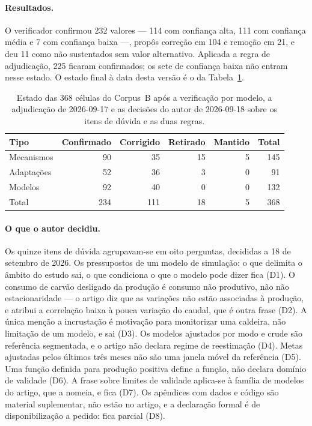 \paragraph{Resultados.} O verificador confirmou 232 valores --- 114 com
confiança alta, 111 com confiança média e 7 com confiança baixa ---, propôs
correção em 104 e remoção em 21, e deu 11 como não sustentados sem valor
alternativo. Aplicada a regra de adjudicação, 225 ficaram confirmados; os sete
de confiança baixa não entram nesse estado. O estado final à data desta versão
é o da Tabela~\ref{tab:apB-verificacao}.

\begin{table}[htbp]
  \centering\small
  \caption[Estado das células do Corpus B após a verificação por
  modelo]{Estado das 368 células do Corpus~B após a verificação por modelo,
  a adjudicação de 2026-09-17 e as decisões do autor de 2026-09-18 sobre os
  itens de dúvida e as duas regras.}
  \label{tab:apB-verificacao}
  \begin{tabular}{lrrrrr}
    \toprule
    Tipo & Confirmado & Corrigido & Retirado & Mantido & Total \\
    \midrule
    Mecanismos  & 90  & 35 & 15 & 5 & 145 \\
    Adaptações  & 52  & 36 & 3  & 0 & 91 \\
    Modelos     & 92  & 40 & 0  & 0 & 132 \\
    \midrule
    Total       & 234 & 111 & 18 & 5 & 368 \\
    \bottomrule
  \end{tabular}
\end{table}

\paragraph{O que o autor decidiu.} Os quinze itens de dúvida agrupavam-se em
oito perguntas, decididas a 18 de setembro de 2026. Os pressupostos de um
modelo de simulação: o que delimita o âmbito do estudo sai, o que condiciona
o que o modelo pode dizer fica (D1). O consumo de carvão desligado da
produção é consumo não produtivo, não não estacionaridade --- o artigo diz
que as variações não estão associadas à produção, e atribui a correlação
baixa à pouca variação do caudal, que é outra frase (D2). A única menção a
incrustação é motivação para monitorizar uma caldeira, não limitação de um
modelo, e sai (D3). Os modelos ajustados por modo e crude são referência
segmentada, e o artigo não declara regime de reestimação (D4). Metas
ajustadas pelos últimos três meses não são uma janela móvel da referência
(D5). Uma função definida para produção positiva define a função, não declara
domínio de validade (D6). A frase sobre limites de validade aplica-se à
família de modelos do artigo, que a nomeia, e fica (D7). Os apêndices com
dados e código são material suplementar, não estão no artigo, e a declaração
formal é de disponibilização a pedido: fica parcial (D8).

